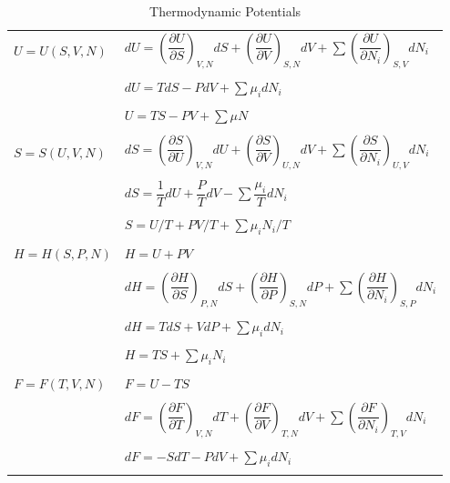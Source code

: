 \documentclass[11pt]{article}
\begin{document}
\begin{table}
  \begin{center}
  \caption{Thermodynamic Potentials} \label{table:potentials}
  \begin{tabular}{ll}
\hline
    $U = U(S,V,N)$ & $dU = \left ( \dfrac{\partial U}{\partial S} \right )_{V,N}
    dS + \left ( \dfrac{\partial
      U}{\partial V}\right )_{S,N} dV + \sum \left (
      \dfrac{\partial U}{\partial N_i} \right )_{S,V} dN_i$  \\ \\
 & $dU = T dS -P dV + \sum \mu_i dN_i $\\ \\
 & $U =TS -PV +\sum \mu N $  \\ \\
  \hline
    $S = S(U,V,N)$ & $dS = \left ( \dfrac{\partial S}{\partial U} \right )_{V,N}
    dU + \left ( \dfrac{\partial
      S}{\partial V}\right )_{U,N} dV + \sum \left (
      \dfrac{\partial S}{\partial N_i} \right )_{U,V} dN_i$  \\ \\
 & $dS = \dfrac{1}{T} dU + \dfrac{P}{T} dV - \sum \dfrac{ \mu_i}{T} dN_i $\\ \\
 & $S = U/T + PV/T +\sum \mu_i N_i/T $  \\ \\
\hline
    $H = H(S,P,N)$ & $H = U + PV$ \\ \\
  & $dH = \left ( \dfrac{\partial H}{\partial S} \right )_{P,N}
    dS + \left ( \dfrac{\partial
      H}{\partial P}\right )_{S,N} dP + \sum \left (
      \dfrac{\partial H}{\partial N_i} \right )_{S,P} dN_i$  \\ \\
 & $dH = T dS + V dP + \sum  \mu_i dN_i $\\ \\
 & $H = TS +\sum \mu_i N_i $  \\ \\
\hline
    $F = F(T,V,N)$ & $F = U - TS$ \\ \\
  & $dF = \left ( \dfrac{\partial F}{\partial T} \right )_{V,N}
    dT + \left ( \dfrac{\partial
      F}{\partial V}\right )_{T,N} dV + \sum \left (
      \dfrac{\partial F}{\partial N_i} \right )_{T,V} dN_i$  \\ \\
 & $dF = -S dT -P dV + \sum  \mu_i dN_i $\\ \\

\end{tabular}
\end{center}
\end{table}
\end{document}
